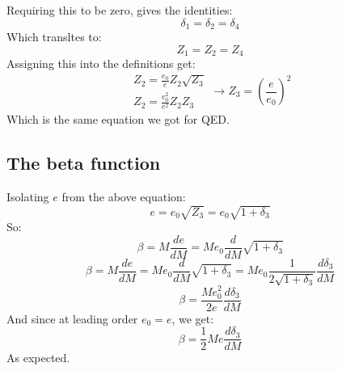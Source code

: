\documentclass{article}
\begin{document}
Requiring this to be zero, gives the identities:
\begin{equation}
    \delta_1 = \delta_2 = \delta_4
\end{equation}
Which transltes to:
\begin{equation}
    Z_1 = Z_2 = Z_4
\end{equation}
Assigning this into the definitions get:
\begin{equation}
    \begin{matrix}
        Z_2 = \frac{e_0}{e}Z_2 \sqrt{Z_3} \\
        Z_2 = \frac{e_0^2}{e^2}Z_2 Z_3
    \end{matrix} \rightarrow Z_3 = \left(\frac{e}{e_0}\right)^2
\end{equation}
Which is the same equation we got for QED.
\subsection{The beta function}
Isolating $e$ from the above equation:
\begin{equation}
    e = e_0 \sqrt{Z_3} = e_0 \sqrt{1 + \delta_3}
\end{equation}
So:
\begin{equation}
    \beta = M\frac{de}{dM} = M e_0 \frac{d}{dM}\sqrt{1 + \delta_3}
\end{equation}
\begin{equation}
    \beta = M\frac{de}{dM} = M e_0 \frac{d}{dM}\sqrt{1 + \delta_3} = M e_0 \frac{1}{2\sqrt{1 + \delta_3}}\frac{d\delta_3}{dM}
\end{equation}
\begin{equation}
    \beta = \frac{M e_0^2}{2e}\frac{d\delta_3}{dM} 
\end{equation}
And since at leading order $e_0 = e$, we get:
\begin{equation}
    \beta = \frac{1}{2}M e\frac{d\delta_3}{dM}
\end{equation}
As expected.
\newpage
\end{document}
